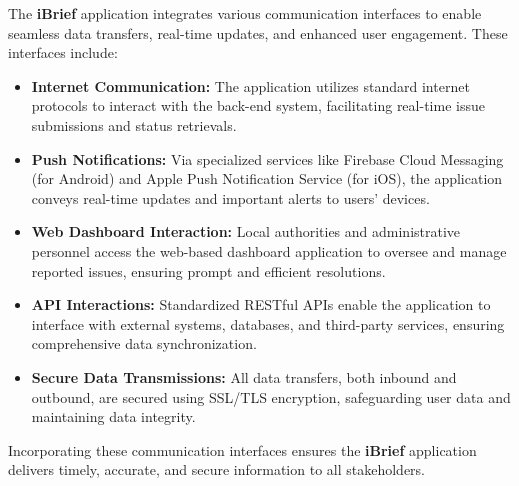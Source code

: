 The \textbf{iBrief} application integrates various communication interfaces to enable seamless data transfers, real-time updates, and enhanced user engagement. These interfaces include:

\begin{itemize}
    \item \textbf{Internet Communication:} The application utilizes standard internet protocols to interact with the \gls{back-end} system, facilitating real-time issue submissions and status retrievals.
    
    \item \textbf{Push Notifications:} Via specialized services like Firebase Cloud Messaging (for Android) and Apple Push Notification Service (for iOS), the application conveys real-time updates and important alerts to users' devices.
    
    \item \textbf{Web Dashboard Interaction:} Local authorities and administrative personnel access the \gls{web-based} \gls{dashboard application} to oversee and manage reported issues, ensuring prompt and efficient resolutions.
    
    \item \textbf{API Interactions:} Standardized RESTful \gls{API}s enable the application to interface with external systems, databases, and third-party services, ensuring comprehensive data synchronization.
    
    \item \textbf{Secure Data Transmissions:} All data transfers, both inbound and outbound, are secured using SSL/TLS encryption, safeguarding user data and maintaining data integrity.
\end{itemize}

Incorporating these communication interfaces ensures the \textbf{iBrief} application delivers timely, accurate, and secure information to all stakeholders.

